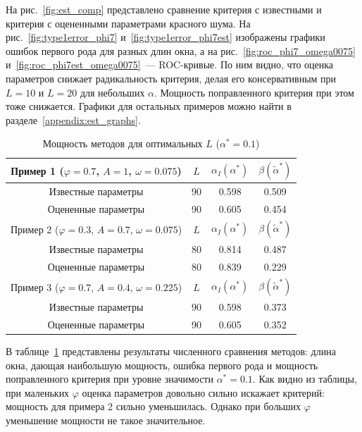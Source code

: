 \documentclass[specialist,
substylefile = spbu.rtx,
               subf,href,colorlinks=true, 12pt]{disser}
\theoremstyle{definition}
\begin{document}
На рис.~\ref{fig:est_comp} представлено сравнение критерия с известными и критерия с оцененными параметрами красного шума. На рис.~\ref{fig:type1error_phi7} и~\ref{fig:type1error_phi7est} изображены графики ошибок первого рода для разных длин окна, а на рис.~\ref{fig:roc_phi7_omega0075} и~\ref{fig:roc_phi7est_omega0075}~--- ROC-кривые. По ним видно, что оценка параметров снижает радикальность критерия, делая его консервативным при $L=10$ и $L=20$ для небольших $\alpha$. Мощность поправленного критерия при этом тоже снижается. Графики для остальных примеров можно найти в разделе~\ref{appendix:est_graphs}.
\begin{table}[h]
	\caption{Мощность методов для оптимальных $L$ ($\alpha^*=0.1$)}
	\label{tab:res_mc-ssa_est}
	\centering
	\begin{tabular}{|cccc|}\hline
		Пример 1 ($\varphi=0.7$, $A=1$, $\omega=0.075$) & $L$ & $\alpha_I(\alpha^*)$ & $\beta(\widetilde\alpha^*)$ \\
		\hline
		Известные параметры & 90 & 0.598 & 0.509 \\
		\hline
		Оцененные параметры & 90 & 0.605 & 0.454 \\
		\hhline{====}
		Пример 2 ($\varphi=0.3$, $A=0.7$, $\omega=0.075$) & $L$ & $\alpha_I(\alpha^*)$ & $\beta(\widetilde\alpha^*)$ \\
		\hline
		Известные параметры & 80 & 0.814 & 0.487 \\
		\hline
		Оцененные параметры & 80 & 0.839 & 0.229 \\
		\hhline{====}
		Пример 3 ($\varphi=0.7$, $A=0.4$, $\omega=0.225$) & $L$ & $\alpha_I(\alpha^*)$ & $\beta(\widetilde\alpha^*)$ \\
		\hline
		Известные параметры & 90 & 0.598 & 0.373 \\
		\hline
		Оцененные параметры & 90 & 0.605 & 0.352\\
		\hline
	\end{tabular}
\end{table}

В таблице~\ref{tab:res_mc-ssa_est} представлены результаты численного сравнения методов: длина окна, дающая наибольшую мощность, ошибка первого рода и мощность поправленного критерия при уровне значимости $\alpha^*=0.1$. Как видно из таблицы, при маленьких $\varphi$ оценка параметров довольно сильно искажает критерий: мощность для примера 2 сильно уменьшилась. Однако при больших $\varphi$ уменьшение мощности не такое значительное.
\end{document}
